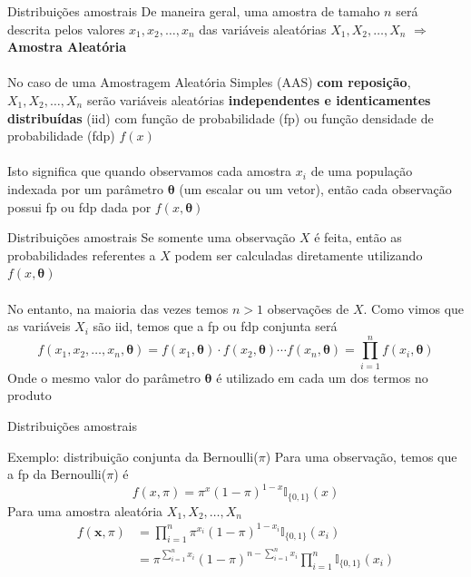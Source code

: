 \documentclass[10pt]{beamer}\usepackage[]{graphicx}\usepackage[]{color}
\newcommand{\mb}[1]{\mathbf{#1}}
\newcommand{\bs}[1]{\boldsymbol{#1}}
\theoremstyle{definition}
\begin{document}
\begin{frame}[fragile=singleslide]{Distribuições amostrais}
  De maneira geral, uma amostra de tamaho $n$ será descrita pelos
  valores $x_1, x_2, \ldots, x_n$ das variáveis aleatórias $X_1, X_2,
  \ldots, X_n$ $\Rightarrow$ \textbf{Amostra Aleatória} \\~\\
  No caso de uma Amostragem Aleatória Simples (AAS) \textbf{com
    reposição}, $X_1, X_2, \ldots, X_n$ serão
  variáveis aleatórias \textbf{independentes e identicamentes
    distribuídas} (iid) com função de probabilidade (fp) ou função
  densidade de probabilidade (fdp) $f(x)$ \\~\\
  Isto significa que quando observamos cada amostra $x_i$ de uma
  população indexada por um parâmetro $\bs{\theta}$ (um escalar ou um
  vetor), então cada observação possui fp ou fdp dada por $f(x,
  \bs{\theta})$
\end{frame}

\begin{frame}[fragile=singleslide]{Distribuições amostrais}
  Se somente uma observação $X$ é feita, então as probabilidades
  referentes a $X$ podem ser calculadas diretamente utilizando
  $f(x,\bs{\theta})$ \\~\\
  No entanto, na maioria das vezes temos $n>1$ observações de $X$. Como
  vimos que as variáveis $X_i$ são iid, temos que a fp ou fdp conjunta
  será
  \begin{equation*}
    f(x_1, x_2, \ldots, x_n, \bs{\theta}) = f(x_1,\bs{\theta}) \cdot
    f(x_2,\bs{\theta}) \cdots f(x_n,\bs{\theta}) = \prod_{i=1}^{n}
    f(x_i,\bs{\theta})
  \end{equation*}
  Onde o mesmo valor do parâmetro $\bs{\theta}$ é utilizado em cada um dos
  termos no produto
\end{frame}

\begin{frame}[fragile=singleslide]{Distribuições amostrais}
  \begin{block}{Exemplo: distribuição conjunta da Bernoulli($\pi$)}
    Para uma observação, temos que a fp da Bernoulli($\pi$) é
    \begin{equation*}
      f(x,\pi) = \pi^x (1-\pi)^{1-x} \mathbb{I}_{\{0,1\}}(x)
    \end{equation*}
    Para uma amostra aleatória $X_1, X_2, \ldots, X_n$
    \begin{align*}
      f(\mb{x},\pi) &= \prod_{i=1}^{n} \pi^{x_{i}} (1-\pi)^{1-x_{i}}
      \mathbb{I}_{\{0,1\}}(x_i) \\
      &= \pi^{\sum_{i=1}^{n} x_i} (1-\pi)^{n - \sum_{i=1}^{n} x_i}
      \prod_{i=1}^{n} \mathbb{I}_{\{0,1\}}(x_i)
    \end{align*}
  \end{block}
\end{frame}
\end{document}
